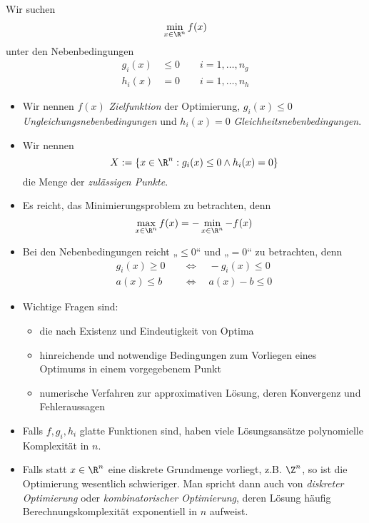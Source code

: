 \documentclass[11pt]{scrbook}
\begin{document}
Wir suchen
\[
	\min_{x \in \R^n} f(x)
\]
unter den Nebenbedingungen
\begin{align*}
	g_i(x) &\le 0 \qquad i=1,\dotsc, n_g \\
	h_i(x) &= 0 \qquad i = 1,\dotsc, n_h
\end{align*}
\begin{itemize}
	\item
		Wir nennen $f(x)$ \emph{Zielfunktion} der Optimierung, $g_i(x) \le 0$ \emph{Ungleichungsnebenbedingungen} und $h_i(x)=0$ \emph{Gleichheitsnebenbedingungen}.
	\item
		Wir nennen
		\[
			X := \{x\in \R^n : g_i(x) \le 0 \land h_i(x) = 0 \}
		\]
		die Menge der \emph{zulässigen Punkte}.
	\item
		Es reicht, das Minimierungsproblem zu betrachten, denn
		\[
			\max_{x\in \R^n} f(x) = -\min_{x\in\R^n} -f(x)
		\]
	\item
		Bei den Nebenbedingungen reicht „$\le 0$“ und „$= 0$“ zu betrachten, denn
		\begin{align*}
			g_i(x) \ge 0 \quad &\iff \quad -g_i(x) \le 0 \\
			a(x) \le b \quad &\iff \quad a(x) - b \le 0
		\end{align*}
	\item
		Wichtige Fragen sind:
		\begin{itemize}
			\item
				die nach Existenz und Eindeutigkeit von Optima 
			\item
				hinreichende und notwendige Bedingungen zum Vorliegen eines Optimums in einem vorgegebenem Punkt
			\item
				numerische Verfahren zur approximativen Lösung, deren Konvergenz und Fehleraussagen
		\end{itemize}
	\item
		Falls $f,g_i,h_i$ glatte Funktionen sind, haben viele Lösungsansätze polynomielle Komplexität in $n$.
	\item
		Falls statt $x\in\R^n$ eine diskrete Grundmenge vorliegt, z.B. $\Z^n$, so ist die Optimierung wesentlich schwieriger.
		Man spricht dann auch von \emph{diskreter Optimierung} oder \emph{kombinatorischer Optimierung}, deren Lösung häufig Berechnungskomplexität exponentiell in $n$ aufweist.
\end{itemize}
\end{document}
